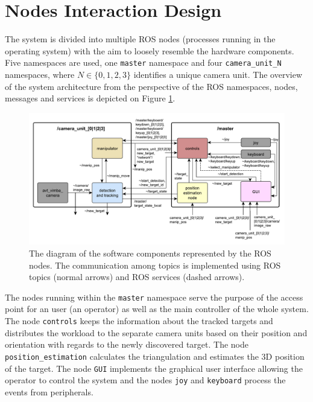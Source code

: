 	\section{Nodes Interaction Design}
	
	
	The system is divided into multiple ROS nodes (processes running in the operating system) with the aim to loosely resemble the hardware components. Five namespaces are used, one \texttt{master} namespace and four \texttt{camera\_unit\_N} namespaces, where $N \in \{0, 1, 2, 3\}$ identifies a unique camera unit. The overview of the system architecture from the perspective of the ROS namespaces, nodes, messages and services is depicted on Figure \ref{fig:sw_ols}.
	
	\begin{figure}[htb]
		\centering
		\includegraphics[width=14.5cm]{fig/sw_ols.pdf}
		\caption{The diagram of the software components represented by the ROS nodes. The communication among topics is implemented using ROS topics (normal arrows) and ROS services (dashed arrows).}
		\label{fig:sw_ols}
	\end{figure}
	
	The nodes running within the \texttt{master} namespace serve the purpose of the access point for an user (an operator) as well as the main controller of the whole system. The node \texttt{controls} keeps the information about the tracked targets and distributes the workload to the separate camera units based on their position and orientation with regards to the newly discovered target. The node \texttt{position\_estimation} calculates the triangulation and estimates the 3D position of the target. The node \texttt{GUI} implements the graphical user interface allowing the operator to control the system and the nodes \texttt{joy} and \texttt{keyboard} process the events from peripherals.
	
